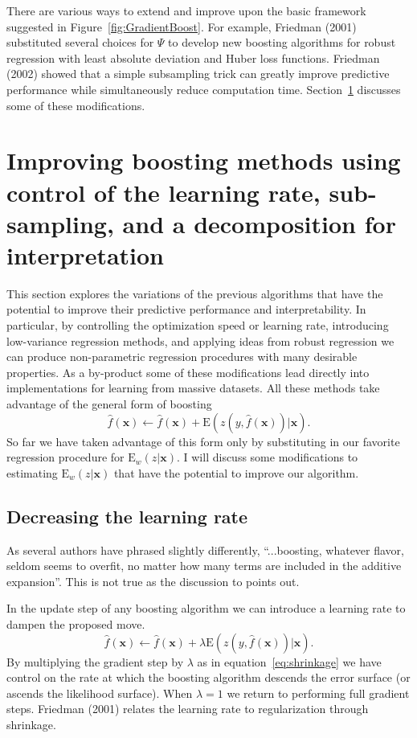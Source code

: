 \documentclass{article}
\newcommand{\EV}{\mathrm{E}}
\begin{document}
There are various ways to extend and improve upon the basic framework suggested in Figure~\ref{fig:GradientBoost}. For example, Friedman (2001) substituted several choices for $\Psi$ to develop new boosting algorithms for robust regression with least absolute deviation and Huber loss functions. Friedman (2002) showed that a simple subsampling trick can greatly improve predictive performance while simultaneously reduce computation time. Section~\ref{GBMModifications} discusses some of these modifications.

\section{Improving boosting methods using control of the learning rate, sub-sampling, and a decomposition for interpretation} \label{GBMModifications}

This section explores the variations of the previous algorithms that have the potential to improve their predictive performance and interpretability. In particular, by controlling the optimization speed or learning rate, introducing low-variance regression methods, and applying ideas from robust regression we can produce non-parametric regression procedures with many desirable properties. As a by-product some of these modifications lead directly into implementations for learning from massive datasets. All these methods take advantage of the general form of boosting 
\begin{equation} 
\hat f(\mathbf{x}) \leftarrow \hat f(\mathbf{x}) + \EV(z(y,\hat f(\mathbf{x}))|\mathbf{x}). 
\end{equation} So far we have taken advantage of this form only by substituting in our favorite regression procedure for $\EV_w(z|\mathbf{x})$. I will discuss some modifications to estimating $\EV_w(z|\mathbf{x})$ that have the potential to improve our algorithm.

\subsection{Decreasing the learning rate} As several authors have phrased slightly differently, ``...boosting, whatever flavor, seldom seems to overfit, no matter how many terms are included in the additive expansion''. This is not true as the discussion to \cite{FHT:2000} points out.

In the update step of any boosting algorithm we can introduce a learning rate to dampen the proposed move. 
\begin{equation} 
\label{eq:shrinkage} 
\hat f(\mathbf{x}) \leftarrow \hat f(\mathbf{x}) + \lambda \EV(z(y,\hat f(\mathbf{x}))|\mathbf{x}). 
\end{equation} 
By multiplying the gradient step by $\lambda$ as in equation~\ref{eq:shrinkage} we have control on the rate at which the boosting algorithm descends the error surface (or ascends the likelihood surface). When $\lambda=1$ we return to performing full gradient steps. Friedman (2001) relates the learning rate to regularization through shrinkage.
\end{document}
